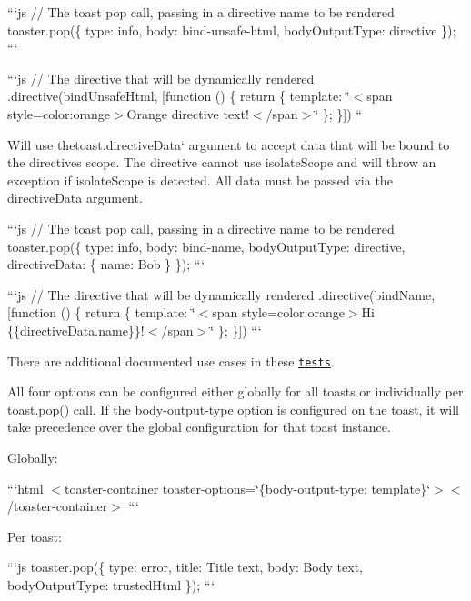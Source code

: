 \begin{DoxyItemize}
\begin{DoxyItemize}
```js // The toast pop call, passing in a directive name to be rendered toaster.\+pop(\{ type\+: \textquotesingle{}info\textquotesingle{}, body\+: \textquotesingle{}bind-\/unsafe-\/html\textquotesingle{}, body\+Output\+Type\+: \textquotesingle{}directive\textquotesingle{} \}); ```

```js // The directive that will be dynamically rendered .directive(\textquotesingle{}bind\+Unsafe\+Html\textquotesingle{}, \mbox{[}function () \{ return \{ template\+: \char`\"{}$<$span style=\textquotesingle{}color\+:orange\textquotesingle{}$>$\+Orange directive text!$<$/span$>$\char`\"{} \}; \}\mbox{]}) ``{\ttfamily }
\item {\ttfamily Will use the}toast.\+directive\+Data` argument to accept data that will be bound to the directive\textquotesingle{}s scope. The directive cannot use isolate\+Scope and will throw an exception if isolate\+Scope is detected. All data must be passed via the directive\+Data argument.

```js // The toast pop call, passing in a directive name to be rendered toaster.\+pop(\{ type\+: \textquotesingle{}info\textquotesingle{}, body\+: \textquotesingle{}bind-\/name\textquotesingle{}, body\+Output\+Type\+: \textquotesingle{}directive\textquotesingle{}, directive\+Data\+: \{ name\+: \textquotesingle{}Bob\textquotesingle{} \} \}); ```

```js // The directive that will be dynamically rendered .directive(\textquotesingle{}bind\+Name\textquotesingle{}, \mbox{[}function () \{ return \{ template\+: \char`\"{}$<$span style=\textquotesingle{}color\+:orange\textquotesingle{}$>$\+Hi \{\{directive\+Data.\+name\}\}!$<$/span$>$\char`\"{} \}; \}\mbox{]}) ```
\end{DoxyItemize}

There are additional documented use cases in these \href{test/directiveTemplateSpec.js}{\tt tests}.
\end{DoxyItemize}

All four options can be configured either globally for all toasts or individually per toast.\+pop() call. If the {\ttfamily body-\/output-\/type} option is configured on the toast, it will take precedence over the global configuration for that toast instance.


\begin{DoxyItemize}
\item Globally\+:

```html $<$toaster-\/container toaster-\/options=\char`\"{}\{\textquotesingle{}body-\/output-\/type\textquotesingle{}\+: \textquotesingle{}template\textquotesingle{}\}\char`\"{}$>$$<$/toaster-\/container$>$ ```
\item Per toast\+:

```js toaster.\+pop(\{ type\+: \textquotesingle{}error\textquotesingle{}, title\+: \textquotesingle{}Title text\textquotesingle{}, body\+: \textquotesingle{}Body text\textquotesingle{}, body\+Output\+Type\+: \textquotesingle{}trusted\+Html\textquotesingle{} \}); ```
\end{DoxyItemize}

